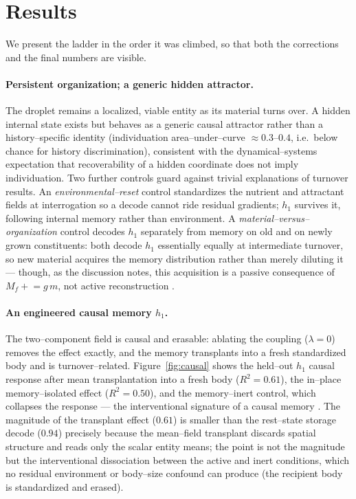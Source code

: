 \documentclass[11pt]{article}
\begin{document}
\section{Results}
\label{sec:results}
We present the ladder in the order it was climbed, so that both the corrections and the final numbers are visible.

\paragraph{Persistent organization; a generic hidden attractor.} The droplet remains a localized, viable entity as
its material turns over. A hidden internal state exists but behaves as a generic causal attractor rather than a
history--specific identity (individuation area--under--curve $\approx0.3$--$0.4$, i.e.\ below chance for
history discrimination), consistent with the dynamical--systems expectation that recoverability of a hidden
coordinate does not imply individuation. Two further controls guard against trivial explanations of turnover results. An \emph{environmental--reset} control standardizes the nutrient and attractant fields at interrogation so a decode cannot ride residual gradients; $h_1$ survives it, following internal memory rather than environment. A \emph{material--versus--organization} control decodes $h_1$ separately from memory on old and on newly grown constituents: both decode $h_1$ essentially equally at intermediate turnover, so new material acquires the memory distribution rather than merely diluting it --- though, as the discussion notes, this acquisition is a passive consequence of $M_f\mathrel{+}=g\,m$, not active reconstruction \citep{hopfield1982,hermann1977}.

\paragraph{An engineered causal memory $h_1$.} The two--component field is causal and erasable: ablating the
coupling ($\lambda=0$) removes the effect exactly, and the memory transplants into a fresh standardized body and is
turnover--related. Figure~\ref{fig:causal} shows the held--out $h_1$ causal response after mean transplantation into
a fresh body ($R^2=0.61$), the in--place memory--isolated effect ($R^2=0.50$), and the memory--inert control, which
collapses the response --- the interventional signature of a causal memory \citep{pearl2009}. The magnitude of the transplant effect ($0.61$) is smaller than the rest--state storage
decode ($0.94$) precisely because the mean--field transplant discards spatial structure and reads only the scalar
entity means; the point is not the magnitude but the interventional dissociation between the active and inert
conditions, which no residual environment or body--size confound can produce (the recipient body is standardized and
erased).
\end{document}
